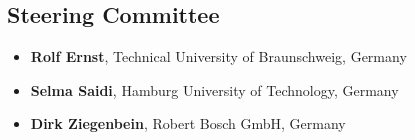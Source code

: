\documentclass[a4paper,10pt] {article}
\begin{document}
\subsection*{Steering Committee}
\begin{itemize}[noitemsep]
\item \textbf{Rolf Ernst}, Technical University of Braunschweig, Germany
\item \textbf{Selma Saidi}, Hamburg University of Technology, Germany 
\item \textbf{Dirk Ziegenbein}, Robert Bosch GmbH, Germany

\end{itemize}
\vspace{-0.3 cm}

\end{document}
